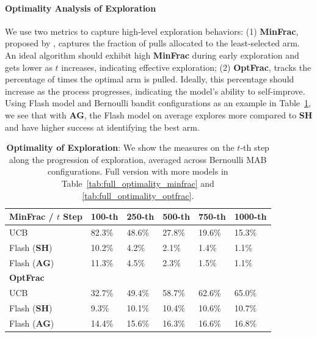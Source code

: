 \documentclass[11pt, logo]{googledeepmind}
\newcommand{\SH}{\textbf{SH}\xspace}
\newcommand{\AG}{\textbf{AG}\xspace}
\theoremstyle{plain}
\theoremstyle{definition}
\begin{document}
\paragraph{Optimality Analysis of Exploration}
We use two metrics to capture high-level exploration behaviors: (1) \textbf{MinFrac}, proposed by \citet{krishnamurthy2024can}, captures the fraction of pulls allocated to the least-selected arm. An ideal algorithm should exhibit high \textbf{MinFrac} during early exploration and gets lower as $t$ increases, indicating effective exploration; (2) \textbf{OptFrac}, tracks the percentage of times the optimal arm is pulled. Ideally, this percentage should increase as the process progresses, indicating the model's ability to self-improve. Using Flash model and Bernoulli bandit configurations as an example in Table~\ref{tab:exploration_optimality}, we see that with \AG, the Flash model on average explores more compared to \SH and have higher success at identifying the best arm.
\begin{table}[h]
\small
\centering
\begin{tabular}{@{}llllll@{}}
\toprule
\textbf{MinFrac} / $t$ Step         & 100-th   & 250-th   & 500-th   & 750-th   & 1000-th                                 \\ \midrule
UCB & 82.3\% & 48.6\% & 27.8\% & 19.6\% & 15.3\% \\
Flash (\SH)  & 10.2\% & 4.2\% & 2.1\% & 1.4\% & 1.1\%  \\
Flash (\AG)  & 11.3\% & 4.5\% & 2.3\% & 1.5\% & 1.1\% \\ \midrule
\textbf{OptFrac} \\ \midrule
UCB & 32.7\% & 49.4\% & 58.7\% & 62.6\% & 65.0\% \\
Flash (\SH) & 9.3\% & 10.1\% & 10.4\% & 10.6\% & 10.7\% \\
Flash (\AG) & 14.4\% & 15.6\% & 16.3\% & 16.6\% & 16.8\% \\
\bottomrule
\end{tabular}
\caption{\footnotesize{\textbf{Optimality of Exploration}: We show the measures on the $t$-th step along the progression of exploration, averaged across Bernoulli MAB configurations. Full version with more models in Table~\ref{tab:full_optimality_minfrac} and \ref{tab:full_optimality_optfrac}.}}
\label{tab:exploration_optimality}
\vspace{-5mm}
\end{table}
\end{document}
